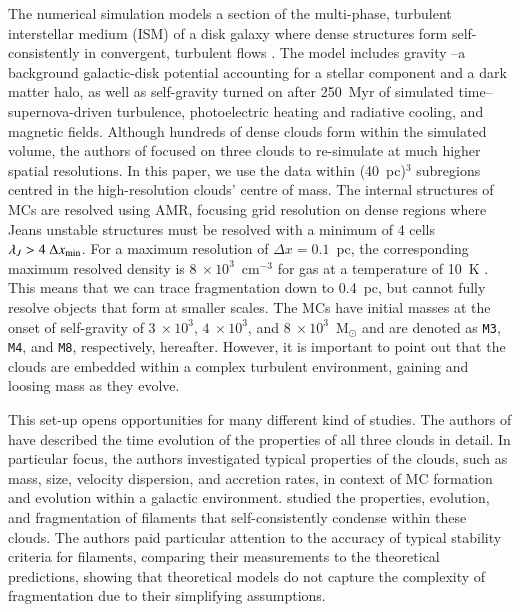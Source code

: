 The numerical simulation models a section of the multi-phase, turbulent interstellar medium (ISM) of a disk galaxy where dense structures form self-consistently in convergent, turbulent flows . 
The model includes gravity --a background galactic-disk potential accounting for a stellar component and a dark matter halo, as well as self-gravity turned on after 250~Myr of simulated time-- supernova-driven turbulence, photoelectric heating and radiative cooling, and magnetic fields. 
Although hundreds of dense clouds form within the simulated volume, the authors of  focused on three clouds to re-simulate at much higher spatial resolutions.
In this paper, we use the data within (40~pc)$^{3}$ subregions centred in the high-resolution clouds' centre of mass.
The internal structures of MCs are resolved using AMR, focusing grid resolution on dense regions where Jeans unstable structures must be resolved with a minimum of 4 cells $\lambda_J > 4~\Delta x_{\rm min}$.
For a maximum resolution of $\Delta x = 0.1$~pc, the corresponding maximum resolved density is $8~\times 10^3$~cm$^{-3}$ for gas at a temperature of 10~K .
This means that we can trace fragmentation down to 0.4~pc, but cannot fully resolve objects that form at smaller scales.
The MCs have initial masses at the onset of self-gravity of $3~\times 10^3$, $4~\times 10^3$, and $8~\times 10^3$~M$_{\odot}$ and are denoted as \texttt{M3}, \texttt{M4}, and \texttt{M8}, respectively, hereafter.
However, it is important to point out that the clouds are embedded within a complex turbulent environment, gaining and loosing mass as they evolve.

This set-up opens opportunities for many different kind of studies. 
The authors of  have described the time evolution of the properties of all three clouds in detail.
In particular focus, the authors investigated typical properties of the clouds, such as mass, size, velocity dispersion, and accretion rates, in context of MC formation and evolution within a galactic environment.
 studied the properties, evolution, and fragmentation of filaments that self-consistently condense within these clouds. 
The authors paid particular attention to the accuracy of typical stability criteria for filaments, comparing their measurements to the theoretical predictions, showing that theoretical models do not capture the complexity of fragmentation due to their simplifying assumptions.

